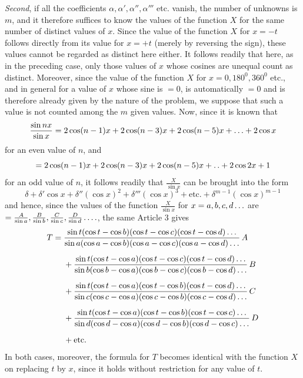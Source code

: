 \textit{Second}, if all the coefficients \(\alpha,\alpha',\alpha'',\alpha'''\) etc. vanish, the number of unknowns is \(m\), and it therefore suffices to know the values of the function \(X\) for the same number of distinct values of \(x\). Since the value of the function \(X\) for \(x=-t\) follows directly from its value for
\(x=+t\) (merely by reversing the sign), these values cannot be regarded as distinct here either. It follows readily that here, as in the preceding case, only those values of \(x\) whose cosines are unequal count as distinct. Moreover, since the value of the function \(X\) for \(x=0,180^0,360^0\)
etc., and in general for a value of \(x\) whose sine is \(=0\), is automatically \(=0\)
and is therefore already given by the nature of the problem, we suppose that such a value is not counted among the \(m\) given values. Now, since it is known that
\[
\frac{\sin nx}{\sin x}=2\cos(n-1)x+2\cos(n-3)x+2\cos(n-5)x+\mathinner{.\,.\,.}+2\cos x
\]
for an even value of \(n\), and
\[
=2\cos(n-1)x+2\cos(n-3)x+2\cos(n-5)x+\mathinner{.\,.}+2\cos 2x+1
\]
for an odd value of \(n\), it follows readily that \(\frac{X}{\sin x}\) can be brought into the form
\[
\delta+\delta'\cos x+\delta''(\cos x)^2+\delta'''(\cos x)^3+\text{etc.}+\delta^{m-1}(\cos x)^{m-1}
\]
and hence, since the values of the function \(\frac{X}{\sin x}\) for \(x=a,b,c,d\mathinner{.\,.\,.}\) are
\(=\frac{A}{\sin a},\frac{B}{\sin b},\frac{C}{\sin c},\frac{D}{\sin d}\mathinner{.\,.\,.\,.}\), the same Article 3 gives
\[
\begin{aligned}
T={}&\frac{\sin t(\cos t-\cos b)(\cos t-\cos c)(\cos t-\cos d)\mathinner{.\,.\,.}}{\sin a(\cos a-\cos b)(\cos a-\cos c)(\cos a-\cos d)\mathinner{.\,.\,.}}\,A\\[5pt]
&+\frac{\sin t(\cos t-\cos a)(\cos t-\cos c)(\cos t-\cos d)\mathinner{.\,.\,.}}{\sin b(\cos b-\cos a)(\cos b-\cos c)(\cos b-\cos d)\mathinner{.\,.\,.}}\,B\\[5pt]
&+\frac{\sin t(\cos t-\cos a)(\cos t-\cos b)(\cos t-\cos d)\mathinner{.\,.\,.}}{\sin c(\cos c-\cos a)(\cos c-\cos b)(\cos c-\cos d)\mathinner{.\,.\,.}}\,C\\[5pt]
&+\frac{\sin t(\cos t-\cos a)(\cos t-\cos b)(\cos t-\cos c)\mathinner{.\,.\,.}}{\sin d(\cos d-\cos a)(\cos d-\cos b)(\cos d-\cos c)\mathinner{.\,.\,.}}\,D\\[5pt]
&+\text{etc.}
\end{aligned}
\]
In both cases, moreover, the formula for \(T\) becomes identical with the function \(X\) on replacing
\(t\) by \(x\), since it holds without restriction for any value of \(t\).

\endgroup
